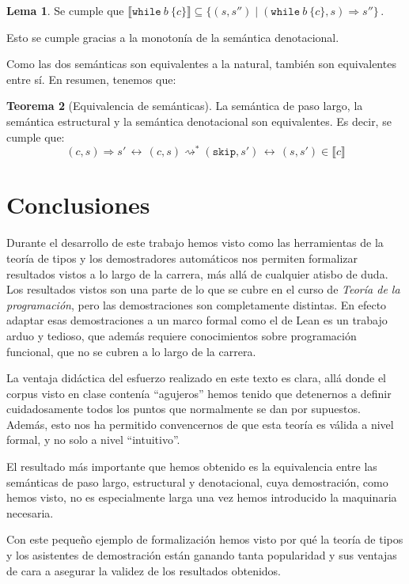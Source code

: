 \documentclass[
  a4paper, 
  10pt, 
  parskip=half, 
  toc=bibliography,
]{scrbook}
\theoremstyle{definition}
\theoremstyle{bolddef}
\newtheorem{theorem}{Teorema}[section]
\newtheorem{lemma}[theorem]{Lema}
\newcommand{\ImpWhile}[2]{\texttt{while} \ {#1} \ \{{#2}\}}
\newcommand{\ImpSkip}{\texttt{skip}}
\newcommand{\bigstep}{\Longrightarrow}
\newcommand{\Denote}[1]{\llbracket{} {#1} \rrbracket{}}
\begin{document}
\begin{lemma}
  Se cumple que \(\Denote{\ImpWhile{b}{c}} \subseteq \{(s, s'') \mid (\ImpWhile{b}{c}, s) \bigstep s'' \}\,\).
\end{lemma}

Esto se cumple gracias a la monotonía de la semántica denotacional.

Como las dos semánticas son equivalentes a la natural, también son
equivalentes entre sí. En resumen, tenemos que:
\begin{theorem}[Equivalencia de semánticas]
  La semántica de paso largo, la semántica estructural y la semántica denotacional
  son equivalentes. Es decir, se cumple que:
  \[
    (c, s) \bigstep s'\, \longleftrightarrow 
      \, (c, s) \rightsquigarrow^* (\ImpSkip, s')\, \longleftrightarrow \, (s, s') \in \Denote{c}
  \]
\end{theorem}

\chapter*{Conclusiones}


Durante el desarrollo de este trabajo hemos visto como las herramientas de 
la teoría de tipos y los demostradores automáticos nos permiten formalizar
resultados vistos a lo largo de la carrera, más allá de cualquier atisbo de duda.
Los resultados vistos son una parte de lo que se cubre en
el curso de \emph{Teoría de la programación}, pero las demostraciones son
completamente distintas. En efecto adaptar esas demostraciones a un
marco formal como el de Lean es un trabajo arduo y tedioso, que además
requiere conocimientos sobre programación funcional, que no se 
cubren a lo largo de la carrera.

La ventaja didáctica del esfuerzo realizado en este texto es clara,
allá donde el corpus visto en clase contenía \enquote{agujeros} hemos
tenido que detenernos a definir cuidadosamente todos los puntos
que normalmente se dan por supuestos. Además, esto nos ha permitido
convencernos de que esta teoría es válida a nivel formal, y no
solo a nivel \enquote{intuitivo}.

El resultado más importante que hemos obtenido es la equivalencia
entre las semánticas de paso largo, estructural y denotacional, cuya demostración, como
hemos visto, no es especialmente larga una vez hemos introducido la
maquinaria necesaria.

Con este pequeño ejemplo de formalización hemos visto por qué la teoría de
tipos y los asistentes de demostración están ganando tanta popularidad
y sus ventajas de cara a asegurar la validez de los resultados obtenidos.
\end{document}
